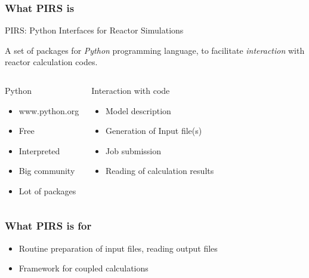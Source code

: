 \begin{frame}\frametitle{What PIRS is}

    \begin{block}{PIRS: Python Interfaces for Reactor Simulations}

    A set of packages for \emph{Python} programming language, to facilitate
    \emph{interaction} with reactor calculation codes.
    \end{block}

    \begin{columns}
    \begin{block}{Python}
    \begin{itemize}

        \item www.python.org

        \item Free 

        \item Interpreted

        \item Big community

        \item Lot of packages 

    \end{itemize}
    \end{block}

    \begin{block}{Interaction with code}
    \begin{itemize}
        
        \item Model description

        \item Generation of Input file(s)

        \item Job submission

        \item Reading of calculation results

    \end{itemize}
    \end{block}
    \end{columns}
\end{frame}

\begin{frame}\frametitle{What PIRS is for}    

    
    \begin{itemize}

    \item Routine preparation of input files, reading output files 

    \item Framework for coupled calculations

    \end{itemize}

\end{frame}

